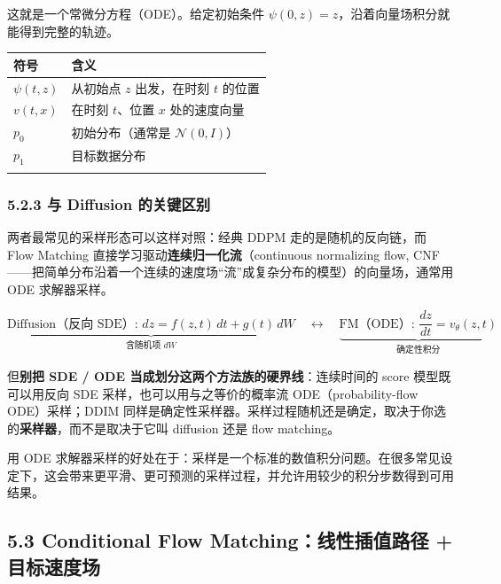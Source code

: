 \documentclass[
  chinese,
]{ctexart}
\begin{document}
这就是一个常微分方程（ODE）。给定初始条件
\(\psi(0, z) = z\)，沿着向量场积分就能得到完整的轨迹。

\begin{center}
\begin{tabular}{@{}>{\raggedright\arraybackslash}p{} >{\raggedright\arraybackslash}p{}@{}}
\toprule\noalign{}
符号 & 含义 \\
\midrule\noalign{}
\(\psi(t, z)\) & 从初始点 \(z\) 出发，在时刻 \(t\) 的位置 \\
\(v(t, x)\) & 在时刻 \(t\)、位置 \(x\) 处的速度向量 \\
\(p_0\) & 初始分布（通常是 \(\mathcal{N}(0, I)\)） \\
\(p_1\) & 目标数据分布 \\
\bottomrule\noalign{}
\end{tabular}
\end{center}

\subsubsection{5.2.3 与 Diffusion
的关键区别}\label{ux4e0e-diffusion-ux7684ux5173ux952eux533aux522b}

两者最常见的采样形态可以这样对照：经典 DDPM 走的是随机的反向链，而 Flow
Matching 直接学习驱动\textbf{连续归一化流}（continuous normalizing flow,
CNF------把简单分布沿着一个连续的速度场``流''成复杂分布的模型）的向量场，通常用
ODE 求解器采样。

\[
\underbrace{\text{Diffusion（反向 SDE）: } dz = f(z, t)\,dt + g(t)\,dW}_{\text{含随机项 } dW} \quad\longleftrightarrow\quad \underbrace{\text{FM（ODE）: } \frac{dz}{dt} = v_\theta(z, t)}_{\text{确定性积分}}
\]

但\textbf{别把 SDE / ODE 当成划分这两个方法族的硬界线}：连续时间的 score
模型既可以用反向 SDE 采样，也可以用与之等价的概率流
ODE（probability-flow ODE）采样；DDIM
同样是确定性采样器。采样过程随机还是确定，取决于你选的\textbf{采样器}，而不是取决于它叫
diffusion 还是 flow matching。

用 ODE
求解器采样的好处在于：采样是一个标准的数值积分问题。在很多常见设定下，这会带来更平滑、更可预测的采样过程，并允许用较少的积分步数得到可用结果。

\subsection{5.3 Conditional Flow Matching：线性插值路径 +
目标速度场}\label{conditional-flow-matchingux7ebfux6027ux63d2ux503cux8defux5f84-ux76eeux6807ux901fux5ea6ux573a}
\end{document}

